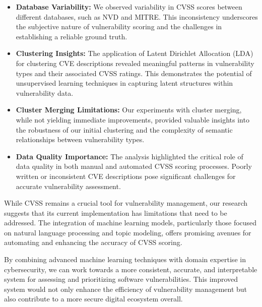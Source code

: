 \documentclass[12pt]{article}
\begin{document}
\begin{itemize}

	\item \textbf{Database Variability:} We observed variability in CVSS scores between
	      different databases, such as NVD and MITRE. This inconsistency underscores the subjective
	      nature of vulnerability scoring and the challenges in establishing a reliable ground truth.

	\item \textbf{Clustering Insights:} The application of Latent Dirichlet Allocation (LDA) for
	      clustering CVE descriptions revealed meaningful patterns in vulnerability types and their
	      associated CVSS ratings. This demonstrates the potential of unsupervised learning techniques
	      in capturing latent structures within vulnerability data.

	\item \textbf{Cluster Merging Limitations:} Our experiments with cluster merging, while not
	      yielding immediate improvements, provided valuable insights into the robustness of our
	      initial clustering and the complexity of semantic relationships between vulnerability types.

	\item \textbf{Data Quality Importance:} The analysis highlighted the critical role of data
	      quality in both manual and automated CVSS scoring processes. Poorly written or inconsistent
	      CVE descriptions pose significant challenges for accurate vulnerability assessment.

\end{itemize}

While CVSS remains a crucial tool for vulnerability management, our research suggests that its
current implementation has limitations that need to be addressed. The integration of machine
learning models, particularly those focused on natural language processing and topic modeling,
offers promising avenues for automating and enhancing the accuracy of CVSS scoring.

By combining advanced machine learning techniques with domain expertise in cybersecurity, we can
work towards a more consistent, accurate, and interpretable system for assessing and prioritizing
software vulnerabilities. This improved system would not only enhance the efficiency of
vulnerability management but also contribute to a more secure digital ecosystem overall.


\printbibliography[title={References}]
\end{document}
